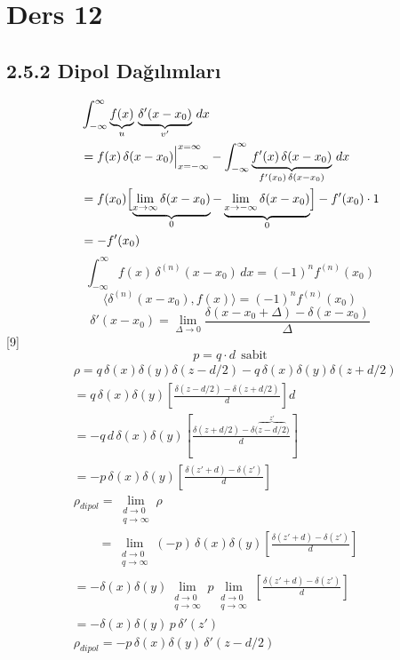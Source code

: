 \documentclass[11pt,a4paper]{article}
\begin{document}
\section{Ders 12}
\subsection*{2.5.2 Dipol Dağılımları}
\begin{align*}
&\int_{-\infty}^{\infty}\underbrace{f(x)}_{u}\,\underbrace{\delta'(x-x_0)}_{v'}\,dx\\
&=f(x)\,\delta(x-x_0)\Big|_{x=-\infty}^{x=\infty}-\int_{-\infty}^{\infty}\underbrace{f'(x)\,\delta(x-x_0)}_{f'(x_0)\,\delta(x-x_0)}\,dx\\
&=f(x_0)\Bigl[\underbrace{\lim_{x\to\infty}\delta(x-x_0)}_{0}-\underbrace{\lim_{x\to-\infty}\delta(x-x_0)}_{0}\Bigr]-f'(x_0)\cdot1\\
&=-f'(x_0)
\end{align*}
\[ \int_{-\infty}^{\infty}f(x)\,\delta^{(n)}(x-x_0)\,dx=(-1)^nf^{(n)}(x_0) \]
\[ \langle\delta^{(n)}(x-x_0),f(x)\rangle=(-1)^nf^{(n)}(x_0) \]
\[ \delta'(x-x_0)=\lim_{\Delta\to0}\frac{\delta(x-x_0+\Delta)-\delta(x-x_0)}{\Delta} \]
[9]
\[ p=q\cdot d\ \ \text{sabit} \]
\begin{align*}
&\rho=q\,\delta(x)\delta(y)\delta(z-d/2)-q\,\delta(x)\delta(y)\delta(z+d/2)\\
&=q\,\delta(x)\delta(y)\left[\frac{\delta(z-d/2)-\delta(z+d/2)}{d}\right]d\\
&=-q\,d\,\delta(x)\delta(y)\left[\frac{\delta(z+d/2)-\delta\bigl(\overbrace{z-d/2}^{z'}\bigr)}{d}\right]\\
&=-p\,\delta(x)\delta(y)\left[\frac{\delta(z'+d)-\delta(z')}{d}\right]\\
&\rho_{dipol}=\lim_{\substack{d\to0\\q\to\infty}}\rho\\
&\qquad=\lim_{\substack{d\to0\\q\to\infty}}(-p)\,\delta(x)\delta(y)\left[\frac{\delta(z'+d)-\delta(z')}{d}\right]\\
&=-\delta(x)\delta(y)\lim_{\substack{d\to0\\q\to\infty}}p\lim_{\substack{d\to0\\q\to\infty}}\left[\frac{\delta(z'+d)-\delta(z')}{d}\right]\\
&=-\delta(x)\delta(y)\,p\,\delta'(z')\\
&\rho_{dipol}=-p\,\delta(x)\delta(y)\,\delta'(z-d/2)
\end{align*}
\end{document}
